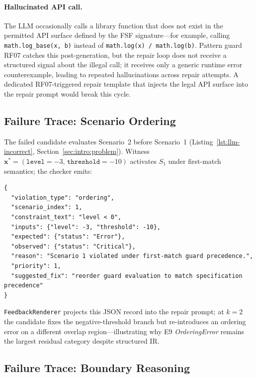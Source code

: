 \paragraph{Hallucinated API call.}
The LLM occasionally calls a library function that does not exist in the
permitted API surface defined by the FSF signature---for example, calling
\texttt{math.log\_base(x, b)} instead of \texttt{math.log(x) / math.log(b)}.
Pattern guard RF07 catches this post-generation, but the repair loop does not
receive a structured signal about the illegal call; it receives only a generic
runtime error counterexample, leading to repeated hallucinations across repair
attempts.
A dedicated RF07-triggered repair template that injects the legal API surface into
the repair prompt would break this cycle.

\subsection{Failure Trace: Scenario Ordering}
\label{subsec:failure-trace-ordering}

The failed  candidate evaluates Scenario~2 before
Scenario~1 (Listing~\ref{lst:llm-incorrect}, Section~\ref{sec:intro:problem}).
Witness $\mathbf{x}^*=(\texttt{level}{=}{-3},\,\texttt{threshold}{=}{-10})$
activates $S_1$ under first-match semantics; the checker emits:

\begin{lstlisting}[language={},caption={Semantic Feedback IR (iteration 1).},
  label=lst:classify-signal-ir]
{
  "violation_type": "ordering",
  "scenario_index": 1,
  "constraint_text": "level < 0",
  "inputs": {"level": -3, "threshold": -10},
  "expected": {"status": "Error"},
  "observed": {"status": "Critical"},
  "reason": "Scenario 1 violated under first-match guard precedence.",
  "priority": 1,
  "suggested_fix": "reorder guard evaluation to match specification precedence"
}
\end{lstlisting}

\texttt{FeedbackRenderer} projects this JSON record into the repair prompt;
at $k=2$ the candidate fixes the negative-threshold branch but re-introduces
an ordering error on a different overlap region---illustrating why E9
\emph{OrderingError} remains the largest residual category despite structured IR.

\subsection{Failure Trace: Boundary Reasoning}
\label{subsec:failure-trace}

